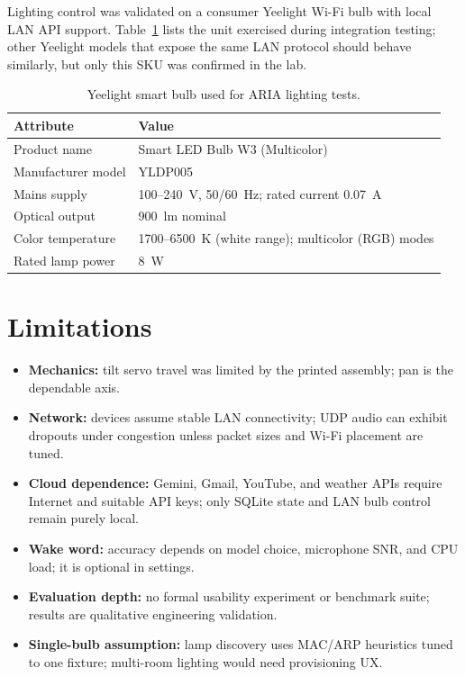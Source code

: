 Lighting control was validated on a consumer Yeelight Wi-Fi bulb with local LAN API support. Table~\ref{tab:yeelight-bulb} lists the unit exercised during integration testing; other Yeelight models that expose the same LAN protocol should behave similarly, but only this SKU was confirmed in the lab.

\begin{table}[H]
\centering
\caption{Yeelight smart bulb used for ARIA lighting tests.}
\label{tab:yeelight-bulb}
\begin{tabular}{@{}ll@{}}
\toprule
\textbf{Attribute} & \textbf{Value} \\
\midrule
Product name & Smart LED Bulb W3 (Multicolor) \\
Manufacturer model & YLDP005 \\
Mains supply & 100--240~V, 50/60~Hz; rated current 0.07~A \\
Optical output & 900~lm nominal \\
Color temperature & 1700--6500~K (white range); multicolor (RGB) modes \\
Rated lamp power & 8~W \\
\bottomrule
\end{tabular}
\end{table}

\section{Limitations}

\begin{itemize}
    \item \textbf{Mechanics:} tilt servo travel was limited by the printed assembly; pan is the dependable axis.
    \item \textbf{Network:} devices assume stable LAN connectivity; UDP audio can exhibit dropouts under congestion unless packet sizes and Wi-Fi placement are tuned.
    \item \textbf{Cloud dependence:} Gemini, Gmail, YouTube, and weather APIs require Internet and suitable API keys; only SQLite state and LAN bulb control remain purely local.
    \item \textbf{Wake word:} accuracy depends on model choice, microphone SNR, and CPU load; it is optional in settings.
    \item \textbf{Evaluation depth:} no formal usability experiment or benchmark suite; results are qualitative engineering validation.
    \item \textbf{Single-bulb assumption:} lamp discovery uses MAC/ARP heuristics tuned to one fixture; multi-room lighting would need provisioning UX.
\end{itemize}

